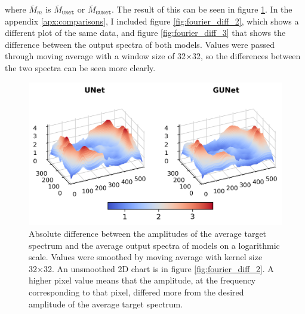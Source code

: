 \noindent where $\bar{M}_{m}$ is $\bar{M}_{\texttt{UNet}}$ or $\bar{M}_{\texttt{GUNet}}$. The result of this can be seen in figure \ref{fig:fourier_diff_1}. In the appendix  \ref{apx:comparisons}, I included figure \ref{fig:fourier_diff_2}, which shows a different plot of the same data, and figure \ref{fig:fourier_diff_3} that shows the difference between the output spectra of both models. Values were passed through moving average with a window size of 32×32, so the differences between the two spectra can be seen more clearly.

\begin{figure}[ht]
    \centering
    \includegraphics[width=\textwidth]{images/fourier_diff_1.png}
    \caption[Difference between the target and output spectra (3D plot)]{\label{fig:fourier_diff_1}Absolute difference between the amplitudes of the average target spectrum and the average output spectra of models on a logarithmic scale. Values were smoothed by moving average with kernel size 32×32. An unsmoothed 2D chart is in figure \ref{fig:fourier_diff_2}. A higher pixel value means that the amplitude, at the frequency corresponding to that pixel, differed more from the desired amplitude of the average target spectrum.}
\end{figure}

